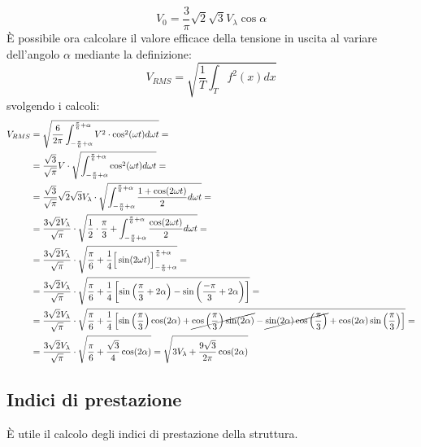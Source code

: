 \documentclass[a4paper,10pt]{article}
\begin{document}
\begin{equation}
 V_0 = \frac{3}{\pi} \sqrt{2} \sqrt{3} V_\lambda \cos\alpha
 \label{eq:valore_medio_tensione_ponte}
\end{equation}
È possibile ora calcolare il valore efficace della tensione in uscita al variare 
dell'angolo \(\alpha\) mediante la definizione:
\begin{equation}
V_{RMS} = \sqrt{\frac{1}{T}\int_T f^2(x)dx}
\end{equation}
svolgendo i calcoli:
\begin{align*}
V_{RMS} &= \sqrt{\frac{6}{2\pi}\int_{-\frac{\pi}{6}+\alpha}^{\frac{\pi}{6}+\alpha}V^2\cdot \cos^2(\omega t) d\omega t  } = \\
&= \frac{\sqrt{3}}{\sqrt{\pi}}V \cdot \sqrt{\int_{-\frac{\pi}{6}+\alpha}^{\frac{\pi}{6}+\alpha} \cos^2(\omega t) d\omega t  } = \\
&= \frac{\sqrt{3}}{\sqrt{\pi}}\sqrt{2} \sqrt{3} V_\lambda\cdot \sqrt{\int_{-\frac{\pi}{6}+\alpha}^{\frac{\pi}{6}+\alpha} \frac{1+\cos(2\omega t)}{2}d\omega t } = \\
&= \frac{3\sqrt{2}V_{\lambda}}{\sqrt{\pi}}\cdot \sqrt{\frac{1}{2}\cdot\frac{\pi}{3} + \int_{-\frac{\pi}{6}+\alpha}^{\frac{\pi}{6}+\alpha} \frac{\cos(2\omega t)}{2}d\omega t } =\\
&= \frac{3\sqrt{2}V_{\lambda}}{\sqrt{\pi}}\cdot \sqrt{ \frac{\pi}{6} +\frac{1}{4}\Big[\sin(2\omega t)\Big]_{-\frac{\pi}{6}+\alpha}^{\frac{\pi}{6}+\alpha} } =\\
&= \frac{3\sqrt{2}V_{\lambda}}{\sqrt{\pi}}\cdot \sqrt{\frac{\pi}{6} + \frac{1}{4}\left[\sin\left(\frac{\pi}{3}+2\alpha\right) - \sin\left(\frac{-\pi}{3}+2\alpha\right)\right] }= \\
&= \frac{3\sqrt{2}V_{\lambda}}{\sqrt{\pi}}\cdot \sqrt{\frac{\pi}{6} + \frac{1}{4}\left[\sin\left(\frac{\pi}{3}\right)\cos(2\alpha) + \cancel{\cos\left(\frac{\pi}{3}\right)\sin(2\alpha)} -\cancel{\sin(2\alpha)\cos\left(\frac{\pi}{3}\right)} + \cos(2\alpha)\sin\left(\frac{\pi}{3}\right)\right]  } =\\
&=\frac{3\sqrt{2}V_{\lambda}}{\sqrt{\pi}}\cdot \sqrt{\frac{\pi}{6} + \frac{\sqrt{3}}{4}\cos(2\alpha) } = \sqrt{3V_\lambda + \frac{9\sqrt{3}}{2\pi}\cos(2\alpha)}
\end{align*}
\subsection{Indici di prestazione}
È utile il calcolo degli indici di prestazione della struttura.
\end{document}
